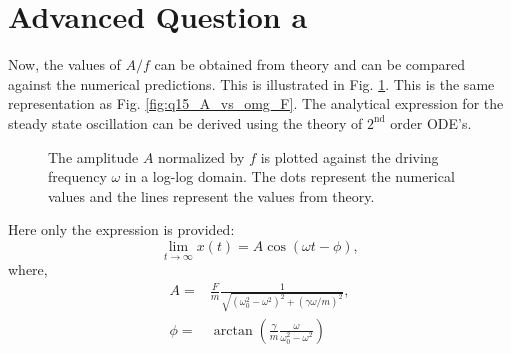 \documentclass[10pt]{article}
\begin{document}
\section*{Advanced Question a}
Now, the values of $A/f$ can be obtained from theory and can be compared against the numerical predictions. This is illustrated in Fig. \ref{fig:AdvA_log_A_f_vs_log_omg}. This is the same representation as Fig. \ref{fig:q15_A_vs_omg_F}. The analytical expression for the steady state oscillation can be derived using the theory of $2^{\mathrm{nd}}$ order ODE's.  

\begin{figure}[!htb]
\centering

\caption{The amplitude $A$ normalized by $f$ is plotted against the driving frequency $\omega$ in a log-log domain. The dots represent the numerical values and the lines represent the values from theory.}
\label{fig:AdvA_log_A_f_vs_log_omg}
\end{figure} 
%
Here only the expression is provided: 
\begin{equation}
\lim_{t \to \infty} x(t) = A\cos(\omega t - \phi),
\end{equation}
%
where,
\begin{eqnarray}
A =& \frac{F}{m}\frac{1}{\sqrt{ ( \omega_{0}^2 - \omega^2  )^2 +  ( \gamma\omega/m )^2 }}, \\
\phi =& \arctan( \frac{\gamma}{m}\frac{\omega}{\omega_{0}^2 - \omega^2} )
\end{eqnarray}
\end{document}
